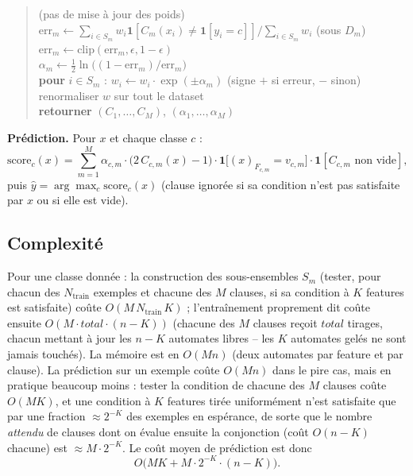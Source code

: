 \documentclass[12pt,a4paper]{article}
\begin{document}
\begin{quote}
\hspace*{1em}(pas de mise à jour des poids)\\
\hspace*{1.5em}$\mathrm{err}_m \gets \sum_{i\in S_m} w_i\mathbf 1[C_m(x_i)\ne\mathbf 1[y_i{=}c]] \big/ \sum_{i\in S_m} w_i$ \hspace*{0.5em}(sous $D_m$)\\
\hspace*{1.5em}$\mathrm{err}_m \gets \mathrm{clip}(\mathrm{err}_m,\epsilon,1-\epsilon)$\\
\hspace*{1.5em}$\alpha_m \gets \tfrac12\ln\bigl((1-\mathrm{err}_m)/\mathrm{err}_m\bigr)$\\
\hspace*{1.5em}\textbf{pour} $i \in S_m$ : $w_i \gets w_i \cdot \exp(\pm\alpha_m)$ (signe $+$ si erreur, $-$ sinon)\\
\hspace*{1.5em}renormaliser $w$ sur tout le dataset\\[4pt]
\textbf{retourner} $(C_1,\ldots,C_M)$, $(\alpha_1,\ldots,\alpha_M)$
\end{quote}

\textbf{Prédiction.} Pour $x$ et chaque classe $c$ :
\[
  \mathrm{score}_c(x) = \sum_{m=1}^M \alpha_{c,m}\cdot\bigl(2\,C_{c,m}(x)-1\bigr)\cdot\mathbf 1\bigl[(x)_{F_{c,m}}=v_{c,m}\bigr]\cdot\mathbf 1[C_{c,m}\text{ non vide}],
\]
puis $\hat y = \arg\max_c \mathrm{score}_c(x)$ (clause ignorée si sa
condition n'est pas satisfaite par $x$ ou si elle est vide).

\subsection{Complexité}

Pour une classe donnée : la construction des sous-ensembles $S_m$ (tester,
pour chacun des $N_{\mathrm{train}}$ exemples et chacune des $M$ clauses, si
sa condition à $K$ features est satisfaite) coûte $O(M\,N_{\mathrm{train}}\,K)$ ;
l'entraînement proprement dit coûte ensuite $O(M\cdot total\cdot(n-K))$
(chacune des $M$ clauses reçoit $total$ tirages, chacun mettant à jour les
$n-K$ automates libres -- les $K$ automates gelés ne sont jamais touchés).
La mémoire est en $O(Mn)$ (deux automates par feature et par clause). La
prédiction sur un exemple coûte $O(Mn)$ dans le pire cas, mais en pratique
beaucoup moins : tester la condition de chacune des $M$ clauses coûte
$O(MK)$, et une condition à $K$ features tirée uniformément n'est
satisfaite que par une fraction $\approx2^{-K}$ des exemples en espérance,
de sorte que le nombre \emph{attendu} de clauses dont on évalue ensuite la
conjonction (coût $O(n-K)$ chacune) est $\approx M\cdot2^{-K}$. Le coût
moyen de prédiction est donc
\[
  O\bigl(MK + M\cdot2^{-K}\cdot(n-K)\bigr).
\]
\end{document}
